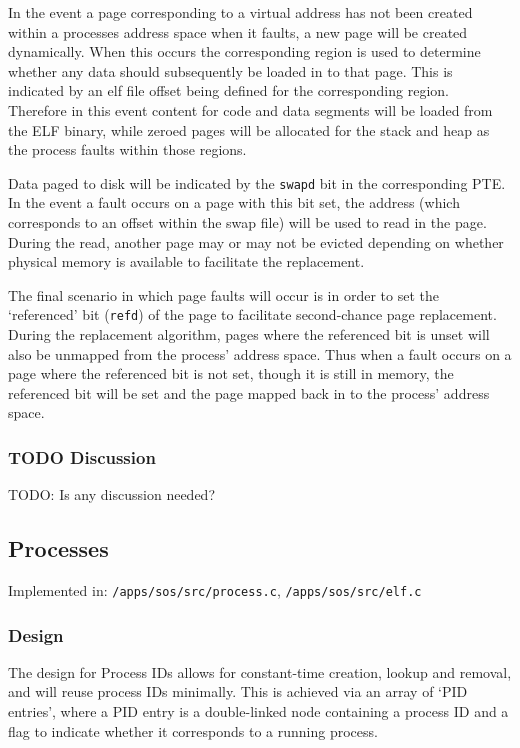\documentclass[a4paper,12pt]{article}
\begin{document}
In the event a page corresponding to a virtual address has not been created
within a processes address space when it faults, a new page will be created
dynamically.  When this occurs the corresponding region is used to determine
whether any data should subsequently be loaded in to that page.  This is
indicated by an elf file offset being defined for the corresponding region.
Therefore in this event content for code and data segments will be loaded from
the ELF binary, while zeroed pages will be allocated for the stack and heap as
the process faults within those regions.

Data paged to disk will be indicated by the \texttt{swapd} bit in the corresponding
PTE.  In the event a fault occurs on a page with this bit set, the address
(which corresponds to an offset within the swap file) will be used to read in
the page.  During the read, another page may or may not be evicted depending
on whether physical memory is available to facilitate the replacement.

The final scenario in which page faults will occur is in order to set the
`referenced' bit (\texttt{refd}) of the page to facilitate second-chance page
replacement.  During the replacement algorithm, pages where the referenced bit
is unset will also be unmapped from the process' address space.  Thus when a
fault occurs on a page where the referenced bit is not set, though it is still
in memory, the referenced bit will be set and the page mapped back in to the
process' address space.

\subsubsection{TODO Discussion}
TODO: Is any discussion needed?

\subsection{Processes}
Implemented in: \texttt{/apps/sos/src/process.c}, \texttt{/apps/sos/src/elf.c}

\subsubsection{Design}
The design for Process IDs allows for constant-time creation, lookup and
removal, and will reuse process IDs minimally.  This is achieved via an array
of `PID entries', where a PID entry is a double-linked node containing a
process ID and a flag to indicate whether it corresponds to a running process.
\end{document}
